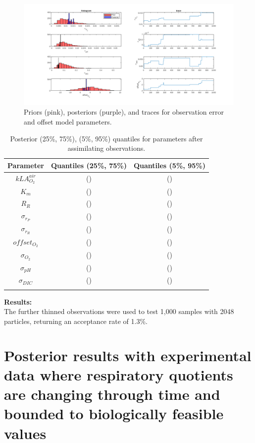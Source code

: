 \documentclass{ruthesis}
\begin{document}
\begin{figure}
	\centerline{\includegraphics[width=1.3\textwidth]{images_microalgae/plots_chris_offset_sigma/sigmas}}
	\caption[.]{Priors (pink), posteriors (purple), and traces for observation error and offset model parameters.}
	\label{fig:micro_exp_offset_sigma_sigmas}
\end{figure}



\begin{longtable}{|c|c|c|} 
	\hline
	\bfseries{Parameter}  & \bfseries{Quantiles (25\%, 75\%)}  & \bfseries{Quantiles (5\%, 95\%)} \\ \hline
	$kLA_{O_2}^{air}$ 	& ()  		& ()   		\\
	$K_m$ 				& () 		& () 	 	\\ 
	$R_R$ 				& () 		& () 		 \\
	$\sigma_{r_P}$ 		& () 		& () 		 \\ 
	$\sigma_{r_R}$ 		& () 		& ()		 \\ 
	$offset_{O_2}$ 		& () 		& ()		 \\ 
	$\sigma_{O_2}$ 		& () 		& ()		 \\ 
	$\sigma_{pH}$ 		& () 		& ()		 \\ 
	$\sigma_{DIC}$ 		& () 		& ()		 \\ 	
	\hline
	\caption[.]{Posterior (25\%, 75\%), (5\%, 95\%) quantiles for parameters after assimilating observations.}	
	\label{table:micro_exp_offset_sigma_parameters_table}
\end{longtable}

\textbf{Results:}\\
The further thinned observations were used to test 1,000 samples with 2048 particles, returning an acceptance rate of 1.3\%.


\FloatBarrier
\chapter{Posterior results with experimental data where respiratory quotients are changing through time and bounded to biologically feasible values}
\end{document}
